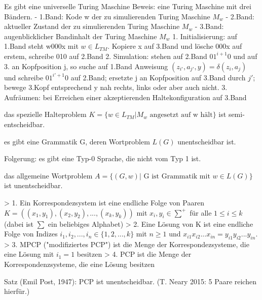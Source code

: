 \documentclass[avery5371]{flashcards}
\begin{document}
\begin{flashcard}[Satz]{} Es gibt eine universelle Turing Maschine
Beweis: eine Turing Maschine mit drei Bändern. 
- 1.Band: Kode w der zu simulierenden Turing Maschine $M_w$
- 2.Band: aktueller Zustand der zu simulierenden Turing Maschine $M_w$
- 3.Band: augenblicklicher Bandinhalt der Turing Maschine $M_w$
1. Initialisierung: auf 1.Band steht w000x mit $w\in L_{TM}$. Kopiere x auf 3.Band und lösche 000x auf erstem, schreibe 010 auf 2.Band
2. Simulation: stehen auf 2.Band $01^{i+1}0$ und auf 3. an Kopfposition j, so suche auf 1.Band Anweisung $(z_{i'},a_{j'},y)=\delta(z_i,a_j)$ und schreibe $01^{i'+1}0$ auf 2.Band; ersetzte j an Kopfposition auf 3.Band durch $j'$; bewege 3.Kopf entsprechend y nah rechts, links oder aber auch nicht.
3. Aufräumen: bei Erreichen einer akzeptierenden Haltekonfiguration auf 3.Band
\end{flashcard}

\begin{flashcard}[Satz]{} das spezielle Halteproblem $K=\{w\in L_{TM} | M_w \text{ angesetzt auf w hält}\}$ ist semi-entscheidbar.
\end{flashcard}

\begin{flashcard}[Satz]{} es gibt eine Grammatik G, deren Wortproblem $L(G)$ unentscheidbar ist.

Folgerung: es gibt eine Typ-0 Sprache, die nicht vom Typ 1 ist.
\end{flashcard}

\begin{flashcard}[Satz]{} das allgemeine Wortproblem $A=\{(G,w) | \text{ G ist Grammatik mit } w\in L(G)\}$ ist unentscheidbar.
\end{flashcard}


\begin{flashcard}[Definition]{}
> 1. Ein Korrespondezsystem ist eine endliche Folge von Paaren $K=((x_1,y_1),(x_2,y_2),...,(x_k,y_k))$ mit $x_i,y_i\in\sum^+$ für alle $1\leq i \leq k$ (dabei ist $\sum$ ein beliebiges Alphabet)
> 2. Eine Lösung von K ist eine endliche Folge von Indizes $i_1,i_2,...,i_n \in \{1,2,...,k\}$ mit $n\geq 1$ und $x_{i1} x_{i2} ... x_{in}=y_{i1} y_{i2}... y_{in}$.
> 3. MPCP ("modifiziertes PCP") ist die Menge der Korrespondezsysteme, die eine Lösung mit $i_1=1$ besitzen
> 4. PCP ist die Menge der Korrespondenzsysteme, die eine Lösung besitzen
\end{flashcard}
 

\begin{flashcard}[Satz]{} Satz  (Emil Post, 1947): PCP ist unentscheidbar. (T. Neary 2015: 5 Paare reichen hierfür.)
\end{flashcard}
\end{document}
